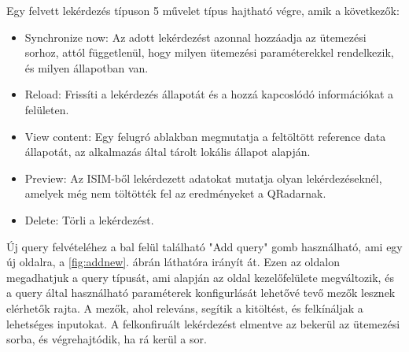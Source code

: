 Egy felvett lekérdezés típuson 5 művelet típus hajtható végre, amik a következők:
\begin{itemize}
	\item Synchronize now: Az adott lekérdezést azonnal hozzáadja az ütemezési sorhoz, attól függetlenül, hogy milyen ütemezési paraméterekkel rendelkezik, és milyen állapotban van.
	\item Reload: Frissíti a lekérdezés állapotát és a hozzá kapcoslódó információkat a felületen.
	\item View content: Egy felugró ablakban megmutatja a feltöltött reference data állapotát, az alkalmazás által tárolt lokális állapot alapján.
	\item Preview: Az ISIM-ből lekérdezett adatokat mutatja olyan lekérdezéseknél, amelyek még nem töltötték fel az eredményeket a QRadarnak.
	\item Delete: Törli a lekérdezést.
\end{itemize}

Új query felvételéhez a bal felül található "Add query" gomb használható, ami egy új oldalra, a \ref{fig:addnew}. ábrán láthatóra irányít át. Ezen az oldalon megadhatjuk a query típusát, ami alapján az oldal kezelőfelülete megváltozik, és a query által használható paraméterek konfigurlását lehetővé tevő mezők lesznek elérhetők rajta. A mezők, ahol releváns, segítik a kitöltést, és felkínáljak a lehetséges inputokat. A felkonfiruált lekérdezést elmentve az bekerül az ütemezési sorba, és végrehajtódik, ha rá kerül a sor.



